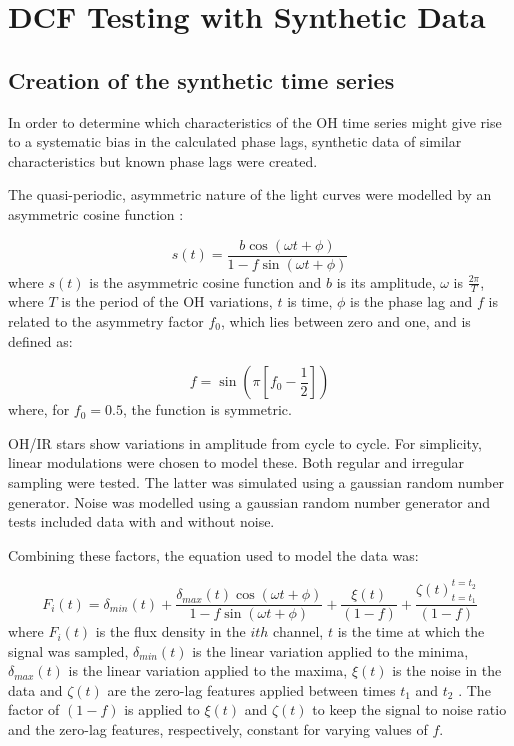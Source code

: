 \documentclass[usenatbib,usegraphicx]{mn2e}
\begin{document}
\section{DCF Testing with Synthetic Data}

\subsection{Creation of the synthetic time series}

In order to determine which characteristics of the OH time series might give
rise to a systematic bias in the calculated phase lags, synthetic data of
similar characteristics but known phase lags were created.

The quasi-periodic, asymmetric nature of the light curves were modelled by
an asymmetric cosine function \citep{DavEtoLS96}:

\begin{equation} 
s(t) = \frac{b\cos (\omega t + \phi)}{1 - f\sin (\omega t +\phi)} 
\end{equation} 
where $s(t)$ is the asymmetric cosine function and $b$ is its amplitude, 
$\omega$ is $\frac{2 \pi}{T}$, where $T$ is the period of the OH variations, 
$t$ is time, $\phi$ is the phase lag and $f$ is related to the asymmetry 
factor $f_{0}$, which lies between zero and one, and is defined as: 

\begin{equation} 
f = \sin (\pi [f_{0} - \frac{1}{2}]) 
\end{equation} 
where, for $f_{0} = 0.5$, the function is symmetric.

OH/IR stars show variations in amplitude from cycle to cycle.  For
simplicity, linear modulations were chosen to model these. Both regular and
irregular sampling were tested.  The latter was simulated using a gaussian
random number generator.  Noise was modelled using a gaussian random number
generator and tests included data with and without noise.

Combining these factors, the equation used to model the data was:

\begin{equation}
F_{i}(t) = \delta_{min}(t) + 
           \frac{\delta_{max}(t)\cos (\omega t+\phi)}
                {1-f\sin (\omega t+\phi)} +
           \frac{\xi(t)}{(1-f)} +
           \frac{\zeta(t)_{t=t_{1}}^{t=t_{2}}}{(1-f)}      
\end{equation}
where $F_{i}(t)$ is the flux density in the $ith$ channel, $t$ is the time
at which the signal was sampled, $\delta_{min}(t)$ is the linear variation
applied to the minima, $\delta_{max}(t)$ is the linear variation applied to
the maxima, $\xi(t)$ is the noise in the data and $\zeta(t)$ are the
zero-lag features applied between times $t_{1}$ and $t_{2}$ .  The factor of
$(1-f)$ is applied to $\xi(t)$ and $\zeta(t)$ to keep the signal to noise
ratio and the zero-lag features, respectively, constant for varying values
of $f$.
\end{document}
